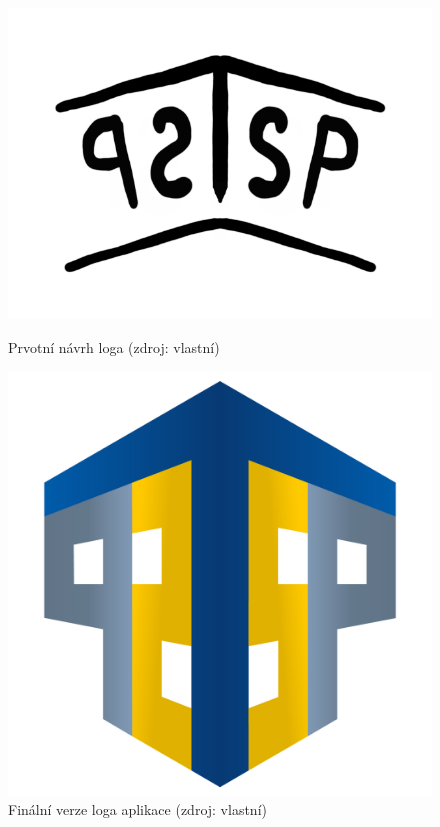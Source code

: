 \documentclass[czech,BP]{thesiskiv}
\begin{document}
	\begin{figure}[H]
		\centering
		\begin{minipage}[c]{0.4\linewidth}
			\includegraphics[width=1\textwidth]{img/logo/prototype_logo}
			\caption{Prvotní návrh loga (zdroj: vlastní)}
			\label{fig:logo.prvni_navrh}
		\end{minipage}\hfill
		\begin{minipage}[c]{0.4\linewidth}
			\includegraphics[width=1\textwidth]{img/logo/transparent_bg_logo}
			\caption{Finální verze loga aplikace (zdroj: vlastní)}
			\label{fig:logo.final}
		\end{minipage}
	\end{figure}
\end{document}
